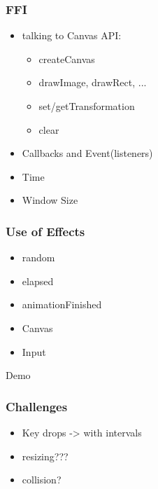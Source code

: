 \documentclass{beamer}
\begin{document}
	
	\begin{frame}
		\frametitle{FFI}
		\begin{itemize}
			\item talking to Canvas API:
			\begin{itemize}
				\item createCanvas
				\item drawImage, drawRect, ...
				\item set/getTransformation
				\item clear
			\end{itemize}
			\item Callbacks and Event(listeners)
			\item Time
			\item Window Size
		\end{itemize}
	\end{frame}
	
	\begin{frame}
		\frametitle{Use of Effects}
		\begin{Large}
		\begin{itemize}
			\setlength{\itemsep}{1em}
			\item random
			\item elapsed
			\item animationFinished
			\item Canvas
			\item Input
		\end{itemize}
		\end{Large}
	\end{frame}
	
	\begin{frame}[plain, c]
		\begin{center}
			\Huge Demo
		\end{center}
	\end{frame}
	
	\begin{frame}
		\frametitle{Challenges}
		\begin{itemize}
			\item Key drops -> with intervals
			\item resizing???
			\item collision?
		\end{itemize}
	\end{frame}
	
\end{document}
